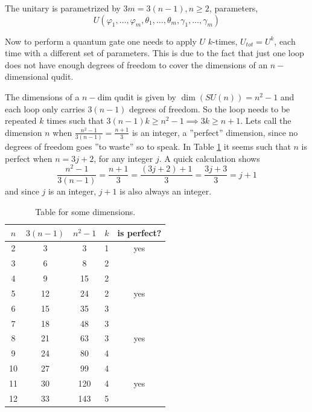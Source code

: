 The unitary is parametrized by $3m = 3(n-1), n\geq 2$, parameters,
\begin{equation}
U(\varphi_1,\dots,\varphi_m,\theta_1,\dots,\theta_m,\gamma_1,\dots,\gamma_m) 
\end{equation} 


Now to perform a quantum gate one needs to apply $U$ $k$-times, $U_{tot} = U^k$, each time with a different set of parameters. This is due to the fact that just one loop does not have enough degrees of freedom to cover the dimensions of an $n-$dimensional qudit.

The dimensions of a $n-$dim qudit is given by $\dim(SU(n)) = n^2 -1$ and each loop only carries $3(n-1)$ degrees of freedom. So the loop needs to be repeated $k$ times such that $3(n-1)k \geq n^2 -1 \implies 3k \geq n + 1$.
Lets call the dimension $n$ when $\frac{n^2-1}{3(n-1)} = \frac{n+1}{3}$ is an integer, a ''perfect'' dimension, since no degrees of freedom goes ''to waste'' so to speak. In Table \ref{tab:dim} it seems such that $n$ is perfect when $n = 3j + 2$, for any integer $j$.
A quick calculation shows
\begin{equation}
\frac{n^2 -1}{3(n-1)} = \frac{n + 1}{3} = \frac{(3j+2) + 1}{3} = \frac{3j+3}{3} = j + 1 
\end{equation}
and since $j$ is an integer, $j + 1$ is also always an integer.\\
\begin{table}[H]
\centering 
\begin{tabular}{|c|c|c|c|c|}
\hline
$n$ & $3(n-1)$ & $n^2 - 1$ & $k$ & is perfect?\\
\hline
2& 3& 3& 1& yes\\
3& 6& 8& 2& \\
4& 9& 15& 2& \\
5& 12& 24& 2& yes \\
6& 15& 35& 3& \\
7& 18& 48& 3& \\
8& 21& 63& 3& yes \\
9& 24& 80& 4& \\
10& 27& 99& 4& \\
11& 30& 120& 4& yes \\
12& 33& 143& 5& \\
\hline
\end{tabular}
\caption{Table for some dimensions.}
\label{tab:dim}
\end{table}

